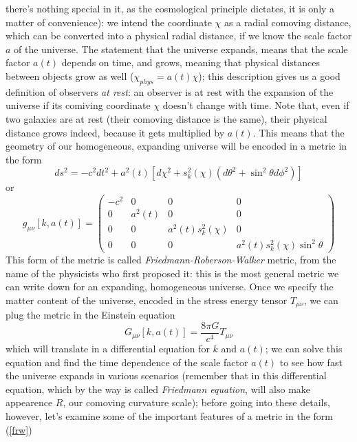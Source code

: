 \documentclass[11pt, a4paper,oneside,openright]{book}
\numberwithin{equation}{section}
\begin{document}
there's nothing special in it, as the cosmological principle dictates, it is only a matter of convenience): we intend the coordinate $\chi$ as a radial comoving distance, which can be converted into a physical radial distance, if we know the scale factor $a$ of the universe. The statement that the universe expands, means that the scale factor $a(t)$ depends on time, and grows, meaning that physical distances between objects grow as well ($\chi_{phys}=a(t)\chi$); this description gives us a good definition of observers \textit{at rest}: an observer is at rest with the expansion of the universe if its comiving coordinate $\chi$ doesn't change with time. Note that, even if two galaxies are at rest (their comoving distance is the same), their physical distance grows indeed, because it gets multiplied by $a(t)$. This means that the geometry of our homogeneous, expanding universe will be encoded in a metric in the form 
\begin{equation}
\label{frw}
ds^2=-c^2dt^2+a^2(t)\left[d\chi^2+s^2_k(\chi)(d\theta^2 + \sin^2{\theta}d\phi^2)\right]
\end{equation}  
or 
\begin{equation}
g_{\mu\nu}[k,a(t)]=
\begin{pmatrix}
-c^2 & 0 & 0 & 0 \\
0 & a^2(t) & 0 & 0 \\
0 & 0 & a^2(t)s_k^2(\chi) & 0 \\
0 & 0 & 0 & a^2(t)s_k^2(\chi)\sin^2{\theta}
\end{pmatrix}
\end{equation}
This form of the metric is called \textit{Friedmann-Roberson-Walker} metric, from the name of the physicists who first proposed it: this is the most general metric we can write down for an expanding, homogeneous universe. Once we specify the matter content of the universe, encoded in the stress energy tensor $T_{\mu\nu}$, we can plug the metric in the Einstein equation
\begin{equation}
\label{einfried}
G_{\mu\nu}[k,a(t)]=\frac{8\pi G}{c^4}T_{\mu\nu}
\end{equation}
which will translate in a differential equation for $k$ and $a(t)$; we can solve this equation and find the time dependence of the scale factor $a(t)$ to see how fast the universe expands in various scenarios (remember that in this differential equation, which by the way is called \textit{Friedmann equation}, will also make appearence $R$, our comoving curvature scale); before going into these details, however, let's examine some of the important features of a metric in the form (\ref{frw})
\end{document}
